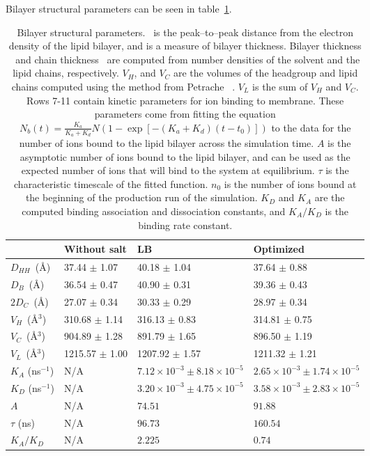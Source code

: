 Bilayer structural parameters can be seen in table~\ref{tabch2:struc}.
\begin{table}[h!tb]
    \caption[Bilayer structural parameters]{Bilayer structural parameters. \dhh~is the peak--to--peak distance from the electron density of the
        lipid bilayer, and is a measure of bilayer thickness. Bilayer thickness \db~and chain thickness \dc~are computed from
        number densities of the solvent and the lipid chains, respectively. $V_H$, and $V_C$ are the volumes of the headgroup and lipid chains computed
        using the method from Petrache \etal~\cite{petrache:1997}. $V_L$ is the sum of $V_H$ and $V_C$. 
        Rows 7-11 contain kinetic parameters for ion binding to membrane. These parameters come from fitting 
        the equation $ N_b(t)= \frac{K_{a}}{K_{a}+K_{d}} 
            N\left(1-\exp\left[-\left(K_{a}+K_{d}\right)\left(t-t_0\right)\right]\right)$ to the data for the number of ions
            bound to the lipid bilayer across the simulation time. 
            $A$ is the asymptotic number of ions bound to the lipid bilayer, and can be used as the expected number of ions
        that will bind to the system at equilibrium. $\tau$ is the characteristic timescale of the fitted function. $n_0$ is the number of ions bound at the beginning
        of the production run of the simulation. $K_D$ and $K_A$ are the computed binding association and dissociation constants, and $K_A/K_D$ is the binding
    rate constant.}
    \label{tabch2:struc}
    {\footnotesize
    \begin{tabularx}{\textwidth}{X|X|X|X}
         &Without salt      &LB                 &Optimized\\\hline
        $D_{HH}$~(\AA)&37.44 $\pm$ 1.07  &40.18 $\pm$ 1.04   &37.64 $\pm$ 0.88 \\
        $D_B$~(\AA)   &36.54 $\pm$ 0.47  &40.90 $\pm$ 0.31   &39.36 $\pm$ 0.43\\
        $2D_C$~(\AA)  &27.07 $\pm$ 0.34  &30.33 $\pm$ 0.29   &28.97 $\pm$ 0.34     \\
        $V_H$~(\AA$^3$) &310.68 $\pm$ 1.14 &316.13 $\pm$ 0.83  &314.81 $\pm$ 0.75          \\
        $V_C$~(\AA$^3$) &904.89 $\pm$ 1.28 &891.79 $\pm$ 1.65  &896.50 $\pm$ 1.19         \\
        $V_L$~(\AA$^3$) &1215.57 $\pm$ 1.00&1207.92 $\pm$ 1.57 &1211.32 $\pm$ 1.21    \\
        $K_{A}$ (ns$^{-1}$)        &N/A & $7.12\times10^{-3}\pm8.18\times10^{-5}$     &$2.65\times10^{-3}\pm1.74\times10^{-5}$ \\
        $K_{D}$ (ns$^{-1}$)        &N/A & $3.20\times10^{-3}\pm4.75\times10^{-5}$     &$3.58\times10^{-3}\pm2.83\times10^{-5}$ \\
        $A$                        &N/A & $74.51$                        &$91.88$ \\
        $\tau$      (ns)           &N/A & $96.73$                      &$160.54$ \\
        $K_{A}/K_{D}$              &N/A & $2.225$                           &$0.74$ \\
              \end{tabularx}
          }
\end{table}
